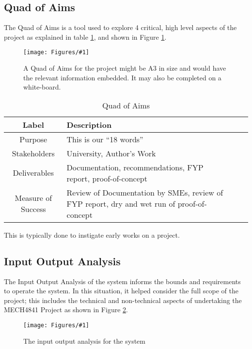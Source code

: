 \documentclass{UoNMCHA}
\newcommand{\fref}[1] {Figure \ref{#1}}
\newcommand{\fFigure}[3]{
	\begin{figure}[h]
        \begin{center}  
            \texttt{[image: Figures/\#1]}  
            \caption{#2}
            \label{#1}
        \end{center}
	\end{figure}
}
\numberwithin{equation}{section}
\begin{document}
\subsection{Quad of Aims}
The Quad of Aims is a tool used to explore 4 critical, high level aspects of the project as explained in table \ref{tab:QuadOfAims}, and shown in \fref{QuadOfAims2.png}.

\fFigure{QuadOfAims2.png}{A Quad of Aims for the project might be A3 in size and would have the relevant information embedded. It may also be completed on a white-board.}{1}

 \begin{table}[h]
    \begin{center}
        \caption{Quad of Aims }\label{tab:QuadOfAims}
        {\footnotesize
            \begin{tabular}{c l l l|}
                \hline\hline Label & Description \\ \hline 
                Purpose & This is our “18 words” \\
                Stakeholders & University, Author’s Work \\
                Deliverables & Documentation, recommendations, FYP report, proof-of-concept \\
                Measure of Success & Review of Documentation by SMEs, review of FYP report, dry and wet run of proof-of-concept \\
                \hline
            \end{tabular}
        }
    \end{center}
\end{table}

This is typically done to instigate early works on a project.

\subsection{Input Output Analysis}
The Input Output Analysis of the system informs the bounds and requirements to operate the system. In this situation, it helped consider the full scope of the project; this includes the technical and non-technical aspects of undertaking the MECH4841 Project as shown in \fref{InputOutput.png}.

\fFigure{InputOutput.png}{The input output analysis for the system}{0.75}
\end{document}
